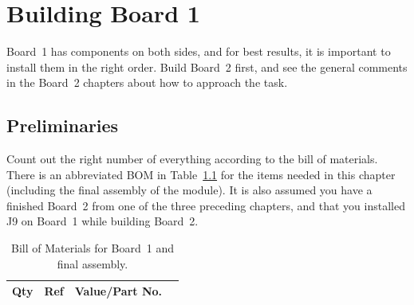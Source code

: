 
%
%
%
%
%
%

\chapter{Building Board 1}\label{ch:board1}

Board~1 has components on both sides, and for best results, it is important
to install them in the right order.  Build Board~2 first, and see the
general comments in the Board~2 chapters about how to approach the task.

\section{Preliminaries}

Count out the right number of everything according to the bill of materials. 
There is an abbreviated BOM in Table~\ref{tab:b1bom} for the items needed in
this chapter (including the final assembly of the module).  It
is also assumed you have a finished Board~2 from one of the three preceding
chapters, and that you installed J9 on Board~1 while building Board~2.

\begin{table}
{\centering
{}
\vspace{\baselineskip}

\begin{tabular}{rp{1in}cp{3in}}
  \textbf{Qty} & \textbf{Ref} & \textbf{Value/Part No.} & \\ \hline

\end{tabular}\par}
\caption{Bill of Materials for Board~1 and final assembly.}\label{tab:b1bom}
\end{table}

